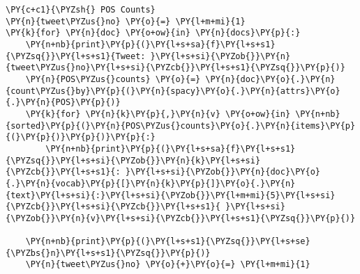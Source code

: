     \begin{tcolorbox}[breakable, size=fbox, boxrule=1pt, pad at break*=1mm,colback=cellbackground, colframe=cellborder]
\begin{Verbatim}[commandchars=\\\{\}]
\PY{c+c1}{\PYZsh{} POS Counts}
\PY{n}{tweet\PYZus{}no} \PY{o}{=} \PY{l+m+mi}{1}
\PY{k}{for} \PY{n}{doc} \PY{o+ow}{in} \PY{n}{docs}\PY{p}{:}
    \PY{n+nb}{print}\PY{p}{(}\PY{l+s+sa}{f}\PY{l+s+s1}{\PYZsq{}}\PY{l+s+s1}{Tweet: }\PY{l+s+si}{\PYZob{}}\PY{n}{tweet\PYZus{}no}\PY{l+s+si}{\PYZcb{}}\PY{l+s+s1}{\PYZsq{}}\PY{p}{)}
    \PY{n}{POS\PYZus{}counts} \PY{o}{=} \PY{n}{doc}\PY{o}{.}\PY{n}{count\PYZus{}by}\PY{p}{(}\PY{n}{spacy}\PY{o}{.}\PY{n}{attrs}\PY{o}{.}\PY{n}{POS}\PY{p}{)}
    \PY{k}{for} \PY{n}{k}\PY{p}{,}\PY{n}{v} \PY{o+ow}{in} \PY{n+nb}{sorted}\PY{p}{(}\PY{n}{POS\PYZus{}counts}\PY{o}{.}\PY{n}{items}\PY{p}{(}\PY{p}{)}\PY{p}{)}\PY{p}{:}
        \PY{n+nb}{print}\PY{p}{(}\PY{l+s+sa}{f}\PY{l+s+s1}{\PYZsq{}}\PY{l+s+si}{\PYZob{}}\PY{n}{k}\PY{l+s+si}{\PYZcb{}}\PY{l+s+s1}{: }\PY{l+s+si}{\PYZob{}}\PY{n}{doc}\PY{o}{.}\PY{n}{vocab}\PY{p}{[}\PY{n}{k}\PY{p}{]}\PY{o}{.}\PY{n}{text}\PY{l+s+si}{:}\PY{l+s+si}{\PYZob{}}\PY{l+m+mi}{5}\PY{l+s+si}{\PYZcb{}}\PY{l+s+si}{\PYZcb{}}\PY{l+s+s1}{ }\PY{l+s+si}{\PYZob{}}\PY{n}{v}\PY{l+s+si}{\PYZcb{}}\PY{l+s+s1}{\PYZsq{}}\PY{p}{)}
    
    \PY{n+nb}{print}\PY{p}{(}\PY{l+s+s1}{\PYZsq{}}\PY{l+s+se}{\PYZbs{}n}\PY{l+s+s1}{\PYZsq{}}\PY{p}{)}
    \PY{n}{tweet\PYZus{}no} \PY{o}{+}\PY{o}{=} \PY{l+m+mi}{1}
\end{Verbatim}
\end{tcolorbox}

